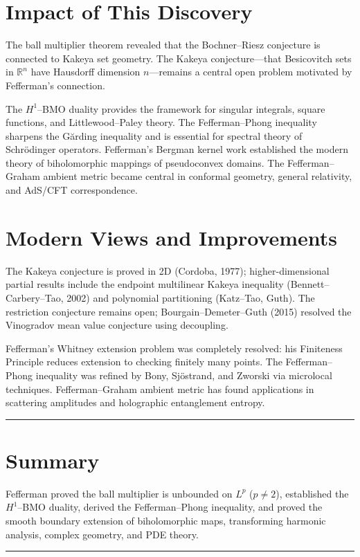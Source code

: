 \section{Impact of This Discovery}

The ball multiplier theorem revealed that the Bochner--Riesz conjecture
is connected to Kakeya set geometry. The Kakeya conjecture---that
Besicovitch sets in $\mathbb{R}^n$ have Hausdorff dimension
$n$---remains a central open problem motivated by Fefferman's connection.

The $H^1$--BMO duality provides the framework for singular integrals,
square functions, and Littlewood--Paley theory. The Fefferman--Phong
inequality sharpens the G\u{a}rding inequality and is essential for
spectral theory of Schr\"{o}dinger operators. Fefferman's Bergman kernel
work established the modern theory of biholomorphic mappings of
pseudoconvex domains. The Fefferman--Graham ambient metric became central
in conformal geometry, general relativity, and AdS/CFT correspondence.

\section{Modern Views and Improvements}

The Kakeya conjecture is proved in 2D (Cordoba, 1977); higher-dimensional
partial results include the endpoint multilinear Kakeya inequality
(Bennett--Carbery--Tao, 2002) and polynomial partitioning (Katz--Tao,
Guth). The restriction conjecture remains open; Bourgain--Demeter--Guth
(2015) resolved the Vinogradov mean value conjecture using decoupling.

Fefferman's Whitney extension problem was completely resolved: his
Finiteness Principle reduces extension to checking finitely many points.
The Fefferman--Phong inequality was refined by Bony, Sj\"{o}strand, and
Zworski via microlocal techniques. Fefferman--Graham ambient metric has
found applications in scattering amplitudes and holographic entanglement
entropy.

\begin{center}\rule{0.5\linewidth}{0.5pt}\end{center}

\section*{Summary}

Fefferman proved the ball multiplier is unbounded on $L^p$ ($p \ne 2$),
established the $H^1$--BMO duality, derived the Fefferman--Phong
inequality, and proved the smooth boundary extension of biholomorphic
maps, transforming harmonic analysis, complex geometry, and PDE theory.

\begin{center}\rule{0.5\linewidth}{0.5pt}\end{center}
